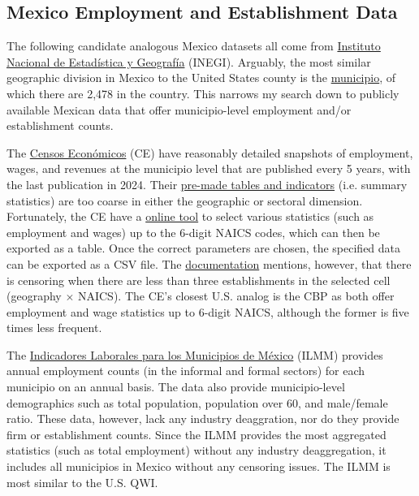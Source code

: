 \subsection{Mexico Employment and Establishment Data}
The following candidate analogous Mexico datasets all come from \href{https://en.www.inegi.org.mx/}{Instituto Nacional de Estadística y Geografía} (INEGI). 
Arguably, the most similar geographic division in Mexico to the United States county is the \href{https://en.wikipedia.org/wiki/Municipalities_of_Mexico}{municipio}, of which there are 2,478 in the country.
This narrows my search down to publicly available Mexican data that offer municipio-level employment and/or establishment counts.

The \href{https://en.www.inegi.org.mx/programas/ce/2024/#documentation}{Censos Económicos} (CE) have reasonably detailed snapshots of employment, wages, and revenues at the municipio level that are published every 5 years, with the last publication in 2024.
Their \href{https://en.www.inegi.org.mx/app/descarga/?p=3366}{pre-made tables and indicators} (i.e. summary statistics) are too coarse in either the geographic or sectoral dimension.
Fortunately, the CE have a \href{https://en.www.inegi.org.mx/app/saic/default.html}{online tool} to select various statistics (such as employment and wages) up to the 6-digit NAICS codes, which can then be exported as a table.
Once the correct parameters are chosen, the specified data can be exported as a CSV file.
The \href{https://en.www.inegi.org.mx/contenidos/app/saic/saic_historico_metodologico_ce2024.pdf}{documentation} mentions, however, that there is censoring when there are less than three establishments in the selected cell (geography $\times$ NAICS).
The CE's closest U.S. analog is the CBP as both offer employment and wage statistics up to 6-digit NAICS, although the former is five times less frequent.

The \href{https://en.www.inegi.org.mx/programas/ilmm/#documentation}{Indicadores Laborales para los Municipios de México} (ILMM) provides annual employment counts (in the informal and formal sectors) for each municipio on an annual basis.
The data also provide municipio-level demographics such as total population, population over 60, and male/female ratio.
These data, however, lack any industry deaggration, nor do they provide firm or establishment counts.
Since the ILMM provides the most aggregated statistics (such as total employment) without any industry deaggregation, it includes all municipios in Mexico without any censoring issues.
The ILMM is most similar to the U.S. QWI.

